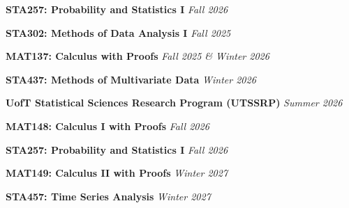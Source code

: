 \vspace{10pt}


\noindent
\textbf{STA257: Probability and Statistics I}
\hfill \textit{Fall 2026}\par
\vspace{3pt}


\vspace{10pt}
\par
\vspace{6pt}

\noindent
\textbf{STA302: Methods of Data Analysis I}
\hfill \textit{Fall 2025}\par
\vspace{3pt}

\noindent
\textbf{MAT137: Calculus with Proofs}
\hfill \textit{Fall 2025 \& Winter 2026}\par
\vspace{3pt}

\noindent
\textbf{STA437: Methods of Multivariate Data}
\hfill \textit{Winter 2026}\par
\vspace{3pt}

\noindent
\textbf{UofT Statistical Sciences Research Program (UTSSRP)}
\hfill \textit{Summer 2026}\par

\vspace{14pt}
\par
\vspace{6pt}

\noindent
\textbf{MAT148: Calculus I with Proofs}
\hfill \textit{Fall 2026}\par
\vspace{3pt}

\noindent
\textbf{STA257: Probability and Statistics I}
\hfill \textit{Fall 2026}\par
\vspace{3pt}

\noindent
\textbf{MAT149: Calculus II with Proofs}
\hfill \textit{Winter 2027}\par
\vspace{3pt}

\noindent
\textbf{STA457: Time Series Analysis}
\hfill \textit{Winter 2027}\par
